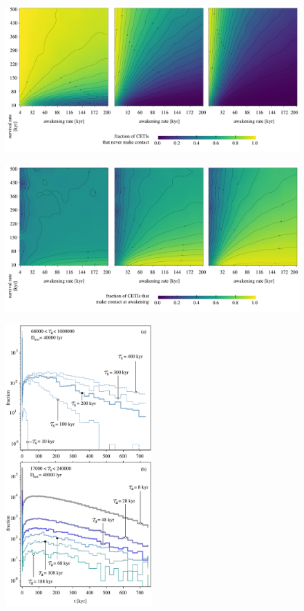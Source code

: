  


\begin{figure} %
   \centering
   \includegraphics[width=\textwidth]{F_never_contact.pdf}
   \label{F_never_contact}
\end{figure}
 
\begin{figure} %
   \centering
   \includegraphics[width=\textwidth]{F_C_at_A.pdf}
   \label{F_C_at_A}
\end{figure}
 
\begin{figure}
   \centering
   \includegraphics[width=0.5\textwidth]{F_waiting_for_1C.pdf}
   \label{F_waiting_for_1C}
\end{figure}


